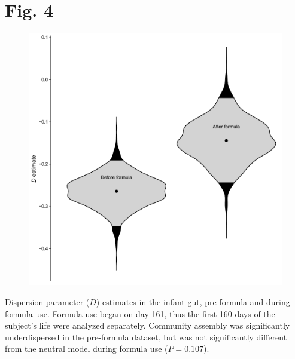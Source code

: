 \documentclass{article}
\begin{document}
\section*{Fig. 4}
\begin{figure}[ht]
	\centering
	\includegraphics[scale=0.80]{../Fig_4.pdf}
\end{figure}
Dispersion parameter (\(D\)) estimates in the infant gut, pre-formula and during formula use. Formula use began on day 161, thus the first 160 days of the subject's life were analyzed separately. Community assembly was significantly underdispersed in the pre-formula dataset, but was not significantly different from the neutral model during formula use (\(P = 0.107\)).
%
\end{document}
